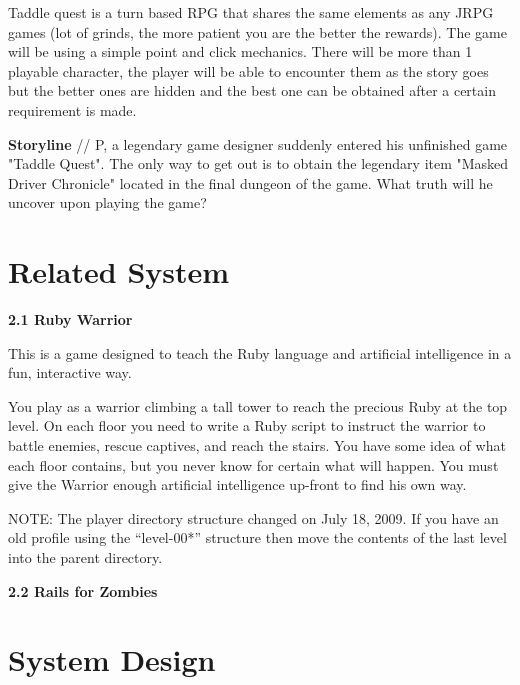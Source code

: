\documentclass{acm_proc_article-sp}
\begin{document}
Taddle quest is a turn based RPG that shares the same elements as any JRPG games (lot of grinds, the more patient you are the better the rewards). The game will be using a simple point and click mechanics. There will be more than 1 playable character, the player will be able to encounter them as the story goes but the better ones are hidden and the best one can be obtained after a certain requirement is made.

\textbf{Storyline}  //
P, a legendary game designer suddenly entered his unfinished game "Taddle Quest". The only way to get out is to obtain the legendary item "Masked Driver Chronicle" located in the final dungeon of the game. What truth will he uncover upon playing the game?


\section{Related System}
\textbf{2.1 Ruby Warrior}

This is a game designed to teach the Ruby language and artificial intelligence in a fun, interactive way.

You play as a warrior climbing a tall tower to reach the precious Ruby at the top level. On each floor you need to write a Ruby script to instruct the warrior to battle enemies, rescue captives, and reach the stairs. You have some idea of what each floor contains, but you never know for certain what will happen. You must give the Warrior enough artificial intelligence up-front to find his own way.

NOTE: The player directory structure changed on July 18, 2009. If you have an old profile using the “level-00*” structure then move the contents of the last level into the parent directory.

\textbf{2.2 Rails for Zombies}


\section{System Design}
\end{document}

